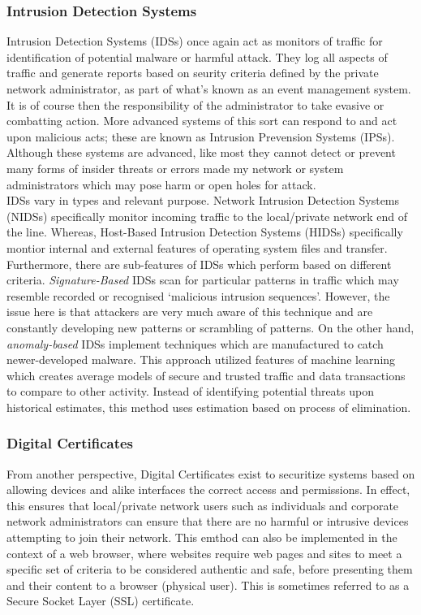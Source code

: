 \documentclass[11pt, english]{article}
\begin{document}
		\subsubsection{Intrusion Detection Systems}

	Intrusion Detection Systems (IDSs) once again act as monitors of traffic for identification of potential malware or harmful attack. They log all aspects of traffic and generate reports based on seurity criteria defined by the private network administrator, as part of what's known as an event management system. It is of course then the responsibility of the administrator to take evasive or combatting action. More advanced systems of this sort can respond to and act upon malicious acts; these are known as Intrusion Prevension Systems (IPSs). Although these systems are advanced, like most they cannot detect or prevent many forms of insider threats or errors made my network or system administrators which may pose harm or open holes for attack.\\

	IDSs vary in types and relevant purpose. Network Intrusion Detection Systems (NIDSs) specifically monitor incoming traffic to the local/private network end of the line. Whereas, Host-Based Intrusion Detection Systems (HIDSs) specifically montior internal and external features of operating system files and transfer.\\

	Furthermore, there are sub-features of IDSs which perform based on different criteria. \textit{Signature-Based} IDSs scan for particular patterns in traffic which may resemble recorded or recognised `malicious intrusion sequences'. However, the issue here is that attackers are very much aware of this technique and are constantly developing new patterns or scrambling of patterns. On the other hand, \textit{anomaly-based} IDSs implement techniques which are manufactured to catch newer-developed malware. This approach utilized features of machine learning which creates average models of secure and trusted traffic and data transactions to compare to other activity. Instead of identifying potential threats upon historical estimates, this method uses estimation based on process of elimination.

		\subsubsection{Digital Certificates}

	From another perspective, Digital Certificates exist to securitize systems based on allowing devices and alike interfaces the correct access and permissions. In effect, this ensures that local/private network users such as individuals and corporate network administrators can ensure that there are no harmful or intrusive devices attempting to join their network. This emthod can also be implemented in the context of a web browser, where websites require web pages and sites to meet a specific set of criteria to be considered authentic and safe, before presenting them and their content to a browser (physical user). This is sometimes referred to as a Secure Socket Layer (SSL) certificate.\\
\end{document}
